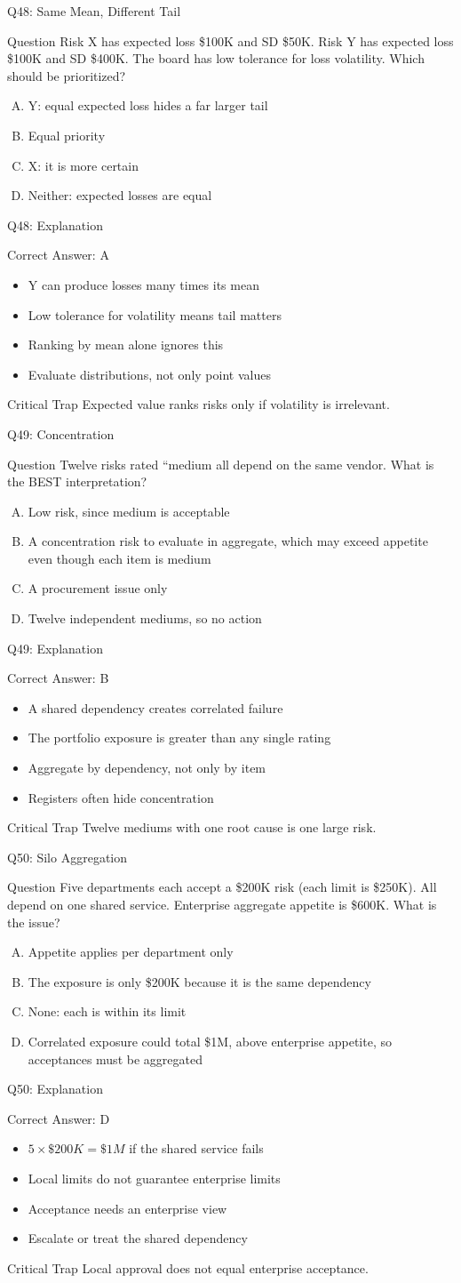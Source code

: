 \documentclass[aspectratio=169]{beamer}
\newcommand{\hq}[7]{%
  \begin{frame}{Q#1: #2}
    \begin{block}{Question}
      #3
    \end{block}
    \begin{enumerate}[(A)]
      #4
    \end{enumerate}
  \end{frame}
  \begin{frame}{Q#1: Explanation}
    \begin{block}{Correct Answer: #5}
      \begin{itemize}
        #6
      \end{itemize}
    \end{block}
    \begin{alertblock}{Critical Trap}
      #7
    \end{alertblock}
  \end{frame}
}
\begin{document}
\hq{48}{Same Mean, Different Tail}
{Risk X has expected loss \$100K and SD \$50K. Risk Y has expected loss \$100K and SD \$400K. The board has low tolerance for loss volatility. Which should be prioritized?}
{\item Y: equal expected loss hides a far larger tail
 \item Equal priority
 \item X: it is more certain
 \item Neither: expected losses are equal}
{A}
{\item Y can produce losses many times its mean
 \item Low tolerance for volatility means tail matters
 \item Ranking by mean alone ignores this
 \item Evaluate distributions, not only point values}
{Expected value ranks risks only if volatility is irrelevant.}

\hq{49}{Concentration}
{Twelve risks rated ``medium all depend on the same vendor. What is the BEST interpretation?}
{\item Low risk, since medium is acceptable
 \item A concentration risk to evaluate in aggregate, which may exceed appetite even though each item is medium
 \item A procurement issue only
 \item Twelve independent mediums, so no action}
{B}
{\item A shared dependency creates correlated failure
 \item The portfolio exposure is greater than any single rating
 \item Aggregate by dependency, not only by item
 \item Registers often hide concentration}
{Twelve mediums with one root cause is one large risk.}

\hq{50}{Silo Aggregation}
{Five departments each accept a \$200K risk (each limit is \$250K). All depend on one shared service. Enterprise aggregate appetite is \$600K. What is the issue?}
{\item Appetite applies per department only
 \item The exposure is only \$200K because it is the same dependency
 \item None: each is within its limit
 \item Correlated exposure could total \$1M, above enterprise appetite, so acceptances must be aggregated}
{D}
{\item $5 \times \$200K = \$1M$ if the shared service fails
 \item Local limits do not guarantee enterprise limits
 \item Acceptance needs an enterprise view
 \item Escalate or treat the shared dependency}
{Local approval does not equal enterprise acceptance.}
\end{document}
